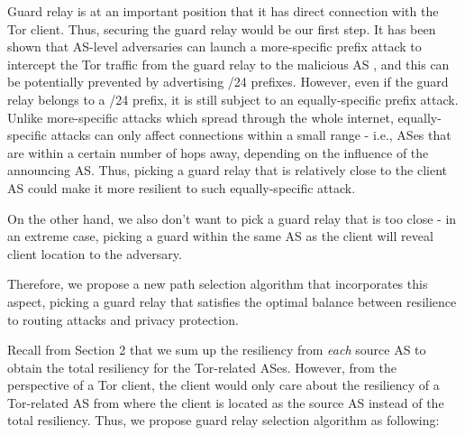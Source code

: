 Guard relay is at an important position that it has direct connection with the Tor client. Thus, securing the guard relay would be our first step. It has been shown that AS-level adversaries can launch a more-specific prefix attack to intercept the Tor traffic from the guard relay to the malicious AS \cite{sun2015raptor}, and this can be potentially prevented by advertising /24 prefixes. However, even if the guard relay belongs to a /24 prefix, it is still subject to an equally-specific prefix attack. Unlike more-specific attacks which spread through the whole internet, equally-specific attacks can only affect connections within a small range - i.e., ASes that are within a certain number of hops away, depending on the influence of the announcing AS. Thus, picking a guard relay that is relatively close to the client AS could make it more resilient to such equally-specific attack.

On the other hand, we also don't want to pick a guard relay that is too close - in an extreme case, picking a guard within the same AS as the client will reveal client location to the adversary. 

Therefore, we propose a new path selection algorithm that incorporates this aspect, picking a guard relay that satisfies the optimal balance between resilience to routing attacks and privacy protection. 

Recall from Section 2 that we sum up the resiliency from \emph{each} source AS to obtain the total resiliency for the Tor-related ASes. However, from the perspective of a Tor client, the client would only care about the resiliency of a Tor-related AS from where the client is located as the source AS instead of the total resiliency. Thus, we propose guard relay selection algorithm as following:

